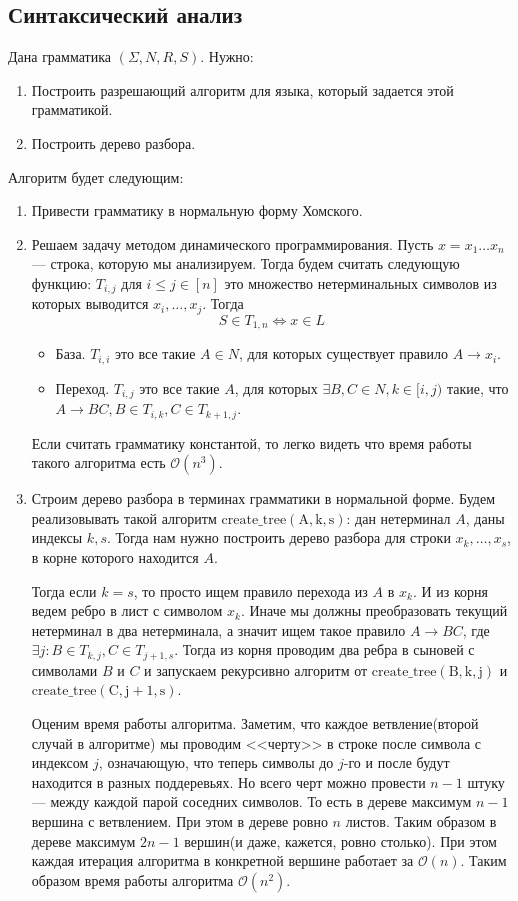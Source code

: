 \subsection{Синтаксический анализ}
Дана грамматика $(\Sigma, N, R, S)$. Нужно:
\begin{enumerate}
  \item Построить разрешающий алгоритм для языка, который задается этой грамматикой.
  \item Построить дерево разбора.
\end{enumerate}
Алгоритм будет следующим:
\begin{enumerate}
  \item Привести грамматику в нормальную форму Хомского.
  \item Решаем задачу методом динамического программирования. Пусть $x = x_1\dotso x_n$ --- строка, которую мы анализируем. Тогда будем считать следующую функцию: $T_{i, j}$ для $i \leq j \in [n]$ это множество нетерминальных символов из которых выводится $x_i, \dotsc, x_j$. Тогда 
    \begin{equation*}
      S \in T_{1, n} \iff x \in L
    \end{equation*}
  \begin{itemize}
    \item База. $T_{i, i}$ это все такие $A \in N$, для которых существует правило $A \to x_i$.
    \item Переход. $T_{i, j}$ это все такие $A$, для которых $\exists B,C \in N, k \in [i, j)$ такие, что $A \to BC, B \in T_{i, k}, C \in T_{k + 1, j}$.
  \end{itemize}
  Если считать грамматику константой, то легко видеть что время работы такого алгоритма есть $\mathcal{O}(n^3)$.
  \item Строим дерево разбора в терминах грамматики в нормальной форме. Будем реализовывать такой алгоритм $\mathrm{create\_tree(A, k, s)}$: дан нетерминал $A$, даны индексы $k, s$. Тогда нам нужно построить дерево разбора для строки $x_k, \dotsc, x_s$, в корне которого находится $A$. 

  Тогда если $k = s$, то просто ищем правило перехода из $A$ в $x_k$. И из корня ведем ребро в лист с символом $x_k$. Иначе мы должны преобразовать текущий нетерминал в два нетерминала, а значит ищем такое правило $A \to BC$, где $\exists j\colon B \in T_{k, j}, C \in T_{j + 1, s}$. Тогда из корня проводим два ребра в сыновей с символами $B$ и $C$ и запускаем рекурсивно алгоритм от $\mathrm{create\_tree(B, k, j)}$ и $\mathrm{create\_tree(C, j + 1, s)}$.

  Оценим время работы алгоритма. Заметим, что каждое ветвление(второй случай в алгоритме) мы проводим <<черту>> в строке после символа с индексом $j$, означающую, что теперь символы до $j$-го и после будут находится в разных поддеревьях. Но всего черт можно провести $n - 1$ штуку --- между каждой парой соседних символов. То есть в дереве максимум $n - 1$ вершина с ветвлением. При этом в дереве ровно $n$ листов. Таким образом в дереве максимум $2n - 1$ вершин(и даже, кажется, ровно столько). При этом каждая итерация алгоритма в конкретной вершине работает за $\mathcal{O}(n)$. Таким образом время работы алгоритма $\mathcal{O}(n^2)$.
\end{enumerate}
